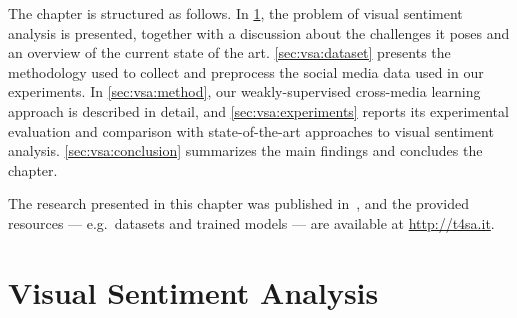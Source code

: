 The chapter is structured as follows.
In \ref{sec:vsa:introduction}, the problem of visual sentiment analysis is presented, together with a discussion about the challenges it poses and an overview of the current state of the art.
\ref{sec:vsa:dataset} presents the methodology used to collect and preprocess the social media data used in our experiments.
In \ref{sec:vsa:method}, our weakly-supervised cross-media learning approach is described in detail, and \ref{sec:vsa:experiments} reports its experimental evaluation and comparison with state-of-the-art approaches to visual sentiment analysis.
\ref{sec:vsa:conclusion} summarizes the main findings and concludes the chapter.

The research presented in this chapter was published in~\cite{vadicamo2017cross}, and the provided resources --- e.g.\ datasets and trained models --- are available at \url{http://t4sa.it}.



\section{Visual Sentiment Analysis}
\label{sec:vsa:introduction}

